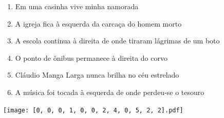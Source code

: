 \documentclass[12pt]{article}
\begin{document}
		 

\pagebreak


	\begin{enumerate}
		  \sffamily %
		  \large %


\vfill \item
Em uma casinha	%
vive minha namorada	%

\vfill \item
A igreja fica	%
à esquerda
da carcaça do homem morto	%

\vfill \item
A escola continua	%
à direita
de onde tiraram lágrimas de um boto	%

\vfill \item
O ponto de ônibus permanece	%
à direita
do corvo	%

\vfill \item
Cláudio Manga Larga nunca	%
brilha no céu estrelado	%

\vfill \item
A música foi tocada	%
à esquerda
de onde perdeu-se o tesouro	%
	\end{enumerate}
		  
		  \hfill

		  \vfill

\texttt{[image: [0, 0, 0, 1, 0, 0, 2, 4, 0, 5, 2, 2].pdf]}


	\hfill	  	  


\pagebreak			
\end{document}
